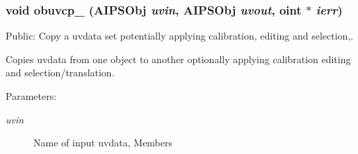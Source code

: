 \subsubsection{\setlength{\rightskip}{0pt plus 5cm}void obuvcp\_\- ({\bf AIPSObj} {\em uvin}, {\bf AIPSObj} {\em uvout}, {\bf oint} $\ast$ {\em ierr})}\label{ObitAIPSFortran_8h_a2}


Public: Copy a uvdata set potentially applying calibration, editing and selection,. 

Copies uvdata from one object to another optionally applying calibration editing and selection/translation. \begin{Desc}
\item[Parameters:]
\begin{description}
\item[{\em uvin}]Name of input uvdata, Members \begin{itemize}

\end{itemize}
\end{description}
\end{Desc}
